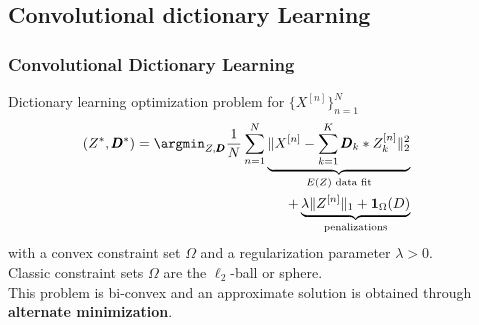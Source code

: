 \documentclass[prez_parietal.tex]{subfiles}
\begin{document}
\subsection{Convolutional dictionary Learning}
\begin{frame}[t]
\frametitle{Convolutional Dictionary Learning}
Dictionary learning optimization problem for $\{X^{[n]}\}_{n=1}^N$ 
\[\hskip-2em\begin{split}
	(Z^*, \pmb D^*) = \argmin_{Z, \pmb D}\frac{1}{N}\sum_{n=1}^N
			\underbrace{\| X^{[n]} - \sum_{k=1}^K\pmb D_k *  Z_k^{[n]}\|_2^2
						}_{E(Z) \text{ data fit}}\\
			+ \underbrace{\lambda\| Z^{[n]}\|_1 + \textbf{1}_{\Omega}(D)
						}_{\text{penalizations}}
\end{split}\]
with a convex constraint set $\Omega$ and a regularization parameter $\lambda > 0$.\\
Classic constraint sets $\Omega$ are the $\ell_2$-ball or sphere.\\[1.5em]
This problem is bi-convex and an approximate solution is obtained through \textbf{alternate minimization}. 
\end{frame}

\end{document}
